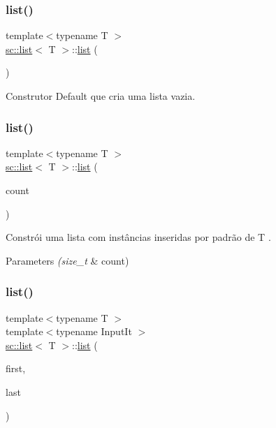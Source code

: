 \subsubsection{\texorpdfstring{list()}{list()}\hspace{0.1cm}{\footnotesize\ttfamily [1/10]}}
{\footnotesize\ttfamily template$<$typename T $>$ \\
\mbox{\hyperlink{classsc_1_1list}{sc\+::list}}$<$ T $>$\+::\mbox{\hyperlink{classsc_1_1list}{list}} (\begin{DoxyParamCaption}\item[{void}]{ }\end{DoxyParamCaption})}

Construtor Default que cria uma lista vazia. \mbox{\label{classsc_1_1list_a154e0a43ee70faa49f66f9ce4ce48583}} 
\subsubsection{\texorpdfstring{list()}{list()}\hspace{0.1cm}{\footnotesize\ttfamily [2/10]}}
{\footnotesize\ttfamily template$<$typename T $>$ \\
\mbox{\hyperlink{classsc_1_1list}{sc\+::list}}$<$ T $>$\+::\mbox{\hyperlink{classsc_1_1list}{list}} (\begin{DoxyParamCaption}\item[{size\+\_\+t}]{count }\end{DoxyParamCaption})\hspace{0.3cm}{\ttfamily [explicit]}}

Constrói uma lista com instâncias inseridas por padrão de T . 
\begin{DoxyParams}{Parameters}
{\em (size\+\_\+t} & count) \\
\hline
\end{DoxyParams}
\mbox{\label{classsc_1_1list_a142545a98bc5fec38606bf7000620864}} 
\subsubsection{\texorpdfstring{list()}{list()}\hspace{0.1cm}{\footnotesize\ttfamily [3/10]}}
{\footnotesize\ttfamily template$<$typename T $>$ \\
template$<$typename Input\+It $>$ \\
\mbox{\hyperlink{classsc_1_1list}{sc\+::list}}$<$ T $>$\+::\mbox{\hyperlink{classsc_1_1list}{list}} (\begin{DoxyParamCaption}\item[{Input\+It}]{first,  }\item[{Input\+It}]{last }\end{DoxyParamCaption})}

